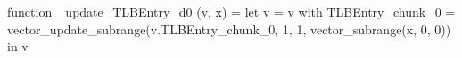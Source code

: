 function _update_TLBEntry_d0 (v, x) = let v = { v with TLBEntry_chunk_0 = vector_update_subrange(v.TLBEntry_chunk_0, 1, 1, vector_subrange(x, 0, 0)) } in v
